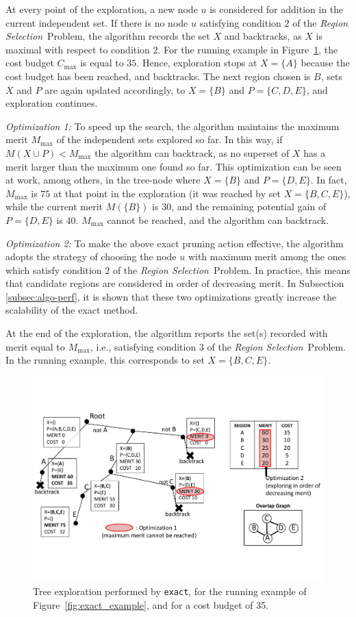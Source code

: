 \documentclass[]{usiinfthesis}
\newcommand{\exact}{\texttt{exact}}
\newcommand{\rsprobname}{\emph{Region Selection}}
\begin{document}
At every point of the exploration, a new node $u$ is considered for
addition in the current independent set. If there is no node $u$
satisfying condition $2$ of the \rsprobname\ Problem, the algorithm
records the set $X$ and backtracks, as $X$ is maximal with respect to
condition $2$.  For the running example in
Figure~\ref{fig:exact_tree}, the cost budget $C_{\max}$ is equal to
$35$. Hence, exploration stops at $X=\{A\}$ because the cost budget
has been reached, and backtracks. The next region chosen is $B$, sets
$X$ and $P$ are again updated accordingly, to $X=\{B\}$ and
$P=\{C,D,E\}$, and exploration continues.

\emph{Optimization 1:} To speed up the search, the algorithm maintains
the maximum merit $M_{\max}$ of the independent sets explored so
far. In this way, if $M(X\cup P) < M_{\max}$ the algorithm can
backtrack, as no superset of $X$ has a merit larger than the maximum
one found so far. This optimization can be seen at work, among others,
in the tree-node where $X=\{B\}$ and $P=\{D,E\}$. In fact, $M_{\max}$
is $75$ at that point in the exploration (it was reached by set
$X=\{B,C,E\}$), while the current merit $M(\{B\})$ is $30$, and the
remaining potential gain of $P=\{D,E\}$ is $40$. $M_{\max}$ cannot be
reached, and the algorithm can backtrack.

\emph{Optimization 2:} To make the above exact pruning action
effective, the algorithm adopts the strategy of choosing the node $u$
with maximum merit among the ones which satisfy condition $2$ of the
\rsprobname\ Problem. In practice, this means that candidate regions are
considered in order of decreasing merit. In Subsection
\ref{subsec:algo-perf}, it is shown that these two optimizations greatly
increase the scalability of the exact method.

At the end of the exploration, the algorithm reports the set(s)
recorded with merit equal to $M_{\max}$, i.e., satisfying condition
$3$ of the \rsprobname\ Problem. In the running example, this
corresponds to set $X=\{B,C,E\}$.

\begin{figure}[t]
\centering
\includegraphics[width= .9 \linewidth]{Figs/exact_tree.pdf}
\caption{Tree exploration performed by \exact, for the running example
  of Figure~\ref{fig:exact_example}, and for a cost budget of 35.}
\label{fig:exact_tree}
\end{figure}
\end{document}
